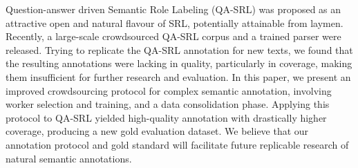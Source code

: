 Question-answer driven Semantic Role Labeling (QA-SRL) was proposed as an attractive open and natural flavour of SRL, potentially attainable from laymen. Recently, a large-scale crowdsourced QA-SRL corpus and a trained parser were released. Trying to replicate the QA-SRL annotation for new texts, we found that the resulting annotations were lacking in quality, particularly in coverage, making them insufficient for further research and evaluation. In this paper, we present an improved crowdsourcing protocol for complex semantic annotation, involving worker selection and training, and a data consolidation phase. Applying this protocol to QA-SRL yielded high-quality annotation with drastically higher coverage, producing a new gold evaluation dataset. We believe that our annotation protocol and gold standard will facilitate future replicable research of natural semantic annotations.
